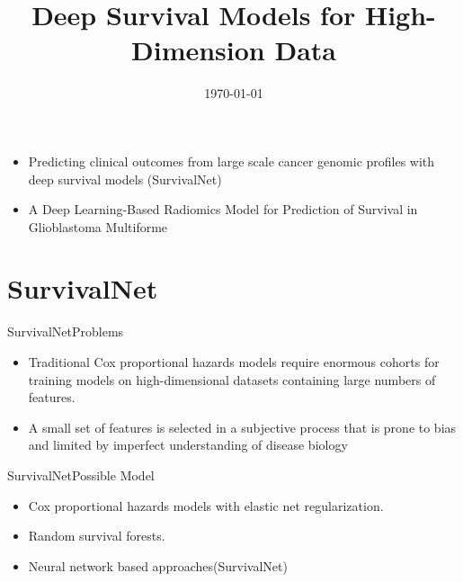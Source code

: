 \documentclass[
]{beamer}
\begin{document}
\title[]{Deep Survival Models for High-Dimension Data}
\date{\today}
\subject{Presentation Subject}

\begin{frame}[plain]
\maketitle
\end{frame}


\begin{frame}[plain]
\begin{itemize}
	\item Predicting clinical outcomes from
	large scale cancer genomic profiles
	with deep survival models (SurvivalNet)
	\item A Deep Learning-Based Radiomics
	Model for Prediction of Survival in
	Glioblastoma Multiforme
\end{itemize}

\end{frame}

\section{SurvivalNet}
\begin{frame}[plain]{SurvivalNet}{Problems}
	\begin{itemize}
		\item Traditional Cox proportional hazards models require enormous cohorts for training models on
		high-dimensional datasets containing large numbers of features. 
		\item  A small set of features is
		selected in a subjective process that is prone to bias and limited by imperfect understanding of disease biology
	\end{itemize}
\end{frame}

\begin{frame}[plain]{SurvivalNet}{Possible Model}
	\begin{itemize}
		\item  Cox proportional hazards models with  elastic net regularization.
		\item  Random survival forests.
		\item  Neural network based approaches(SurvivalNet)
	\end{itemize}
\end{frame}
\end{document}
